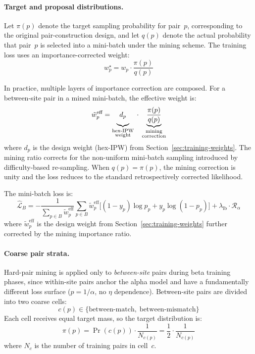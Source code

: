 \documentclass{article}
\begin{document}
\paragraph{Target and proposal distributions.}
Let $\pi(p)$ denote the target sampling probability for pair~$p$, corresponding to the original pair-construction design, and let $q(p)$ denote the actual probability that pair~$p$ is selected into a mini-batch under the mining scheme. The training loss uses an importance-corrected weight:
\begin{equation}
    w_p^\star = w_p \cdot \frac{\pi(p)}{q(p)}
\end{equation}

In practice, multiple layers of importance correction are composed. For a between-site pair in a mined mini-batch, the effective weight is:
\begin{equation}
    \tilde{w}_p^{\text{eff}} = \underbrace{d_p\vphantom{\frac{1}{\alpha_h}}}_{\substack{\text{hex-IPW}\\\text{weight}}} \;\cdot\; \underbrace{\frac{\pi(p)}{q(p)}}_{\substack{\text{mining}\\\text{correction}}}
\end{equation}
where $d_p$ is the design weight (hex-IPW) from Section~\ref{sec:training-weights}. The mining ratio corrects for the non-uniform mini-batch sampling introduced by difficulty-based re-sampling. When $q(p) = \pi(p)$, the mining correction is unity and the loss reduces to the standard retrospectively corrected likelihood.

The mini-batch loss is:
\begin{equation}
    \widehat{\mathcal{L}}_B
    =
    -\frac{1}{\sum_{p \in B} \tilde{w}_p^{\text{eff}}}
    \sum_{p \in B}
    \tilde{w}_p^{\text{eff}}
    \Big[(1-y_p)\log p_p + y_p \log(1-p_p)\Big]
    + \lambda_{\text{lb}} \cdot \mathcal{R}_\alpha
\end{equation}
where $\tilde{w}_p^{\text{eff}}$ is the design weight from Section~\ref{sec:training-weights} further corrected by the mining importance ratio.

\paragraph{Coarse pair strata.}
Hard-pair mining is applied only to \emph{between-site} pairs during beta training phases, since within-site pairs anchor the alpha model and have a fundamentally different loss surface ($p = 1/\alpha$, no $\eta$ dependence). Between-site pairs are divided into two coarse cells:
\[
c(p) \in \{\text{between-match},\; \text{between-mismatch}\}
\]
Each cell receives equal target mass, so the target distribution is:
\begin{equation}
    \pi(p) = \Pr(c(p)) \cdot \frac{1}{N_{c(p)}} = \frac{1}{2} \cdot \frac{1}{N_{c(p)}}
\end{equation}
where $N_c$ is the number of training pairs in cell~$c$.
\end{document}

